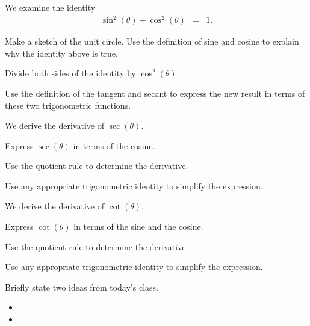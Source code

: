 \begin{problem}

\item We examine the identity 
  \begin{eqnarray*}
    \sin^2(\theta) + \cos^2(\theta) & = & 1.
  \end{eqnarray*}
  
  \begin{subproblem}
  \item Make a sketch of the unit circle. Use the definition of sine
    and cosine to explain why the identity above is true.
    \vfill

  \item Divide both sides of the identity by $\cos^2(\theta)$. 
    \vfill

  \item Use the definition of the tangent and secant to express the
    new result in terms of these two trigonometric functions.
    \vfill

  \end{subproblem}

  \clearpage

\item We derive the derivative of $\sec(\theta)$.

  \begin{subproblem}
    \item Express $\sec(\theta)$ in terms of the cosine.
      \vspace{4em}
    \item Use the quotient rule to determine the derivative.
      \vfill
    \item Use any appropriate trigonometric identity to simplify the
      expression.
      \vfill
  \end{subproblem}
  \clearpage

\item We derive the derivative of $\cot(\theta)$.

  \begin{subproblem}
    \item Express $\cot(\theta)$ in terms of the sine and the cosine.
      \vspace{4em}
    \item Use the quotient rule to determine the derivative.
      \vfill
    \item Use any appropriate trigonometric identity to simplify the
      expression.
      \vfill
  \end{subproblem}
  \clearpage

\end{problem}

\postClass

\begin{problem}
\item Briefly state two ideas from today's class.
  \begin{itemize}
  \item 
  \item 
  \end{itemize}
\item 
  \begin{subproblem}
    \item
  \end{subproblem}
\end{problem}


